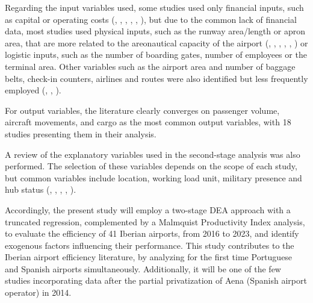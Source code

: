 Regarding the input variables used, some studies used only financial inputs, such as capital or operating costs (\cite{martin2001}, \cite{barros2008}, \cite{barrosdieke2008}, \cite{coto-millan2014}, \cite{coto-millan2016}, \cite{inglada2018}), but due to the common lack of financial data, most studies used physical inputs, such as the runway area/length or apron area, that are more related to the areonautical capacity of the airport (\cite{lin2006}, \cite{barros2008b}, \cite{tsekeris2011}, \cite{lozano2013}, \cite{fragoudaki2016}, \cite{gutierrez2016}) or logistic inputs, such as the number of boarding gates, number of employees or the terminal area.
Other variables such as the airport area and number of baggage belts, check-in counters, airlines and routes were also identified but less frequently employed (\cite{lozano2013}, \cite{gutierrez2016}, \cite{cifuentes-faura2023}). 

For output variables, the literature clearly converges
on passenger volume, aircraft movements, and cargo as the most common output variables, with 18 studies presenting them in their analysis.

A review of the explanatory variables used in the second-stage analysis was also performed. The selection of these variables depends on the scope of each study, but common variables include location, working load unit, military presence and hub status (\cite{barrosdieke2008}, \cite{barros2008b}, \cite{tsekeris2011}, \cite{adler2013}, \cite{fragoudaki2016}).

Accordingly, the present study will employ a two-stage DEA approach with a truncated regression, complemented by a Malmquist Productivity Index analysis, to evaluate the efficiency of 41 Iberian airports, from 2016 to 2023, and identify exogenous factors influencing their performance. 
This study contributes to the Iberian airport efficiency literature, by analyzing for the first time Portuguese and Spanish airports simultaneously. Additionally, it will be one of the few studies incorporating data after the partial privatization of Aena (Spanish airport operator) in 2014. 